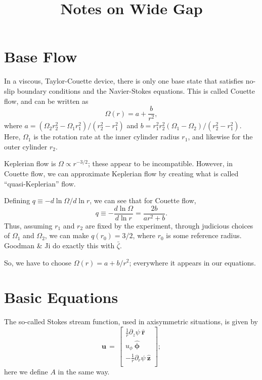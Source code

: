 \documentclass{paper}
\newcommand{\uphi}{\ensuremath{u_\phi}}
\newcommand{\rhat}{\ensuremath{\mathbf{\hat{r}}}}
\newcommand{\phihat}{\ensuremath{\mathbf{\hat{\phi}}}}
\newcommand{\zhat}{\ensuremath{\mathbf{\hat{z}}}}
\begin{document}
\title{Notes on Wide Gap}

\section{Base Flow}
In a viscous, Taylor-Couette device, there is only one base state that
satisfies no-slip boundary conditions and the Navier-Stokes
equations. This is called Couette flow, and can be written as
\begin{equation}
  \label{eq:couette_flow}
  \Omega(r) = a + \frac{b}{r^2},
\end{equation}
where $a = (\Omega_2 r^2_2 - \Omega_1 r^2_1)/(r^2_2 - r^2_1)$ and
$b = r^2_1 r^2_2 (\Omega_1 - \Omega_2)/(r^2_2 - r^2_1)$. Here,
$\Omega_1$ is the rotation rate at the inner cylinder radius $r_1$,
and likewise for the outer cylinder $r_2$. 

Keplerian flow is $\Omega \propto r^{-3/2}$; these appear to be
incompatible. However, in Couette flow, we can approximate Keplerian
flow by creating what is called ``quasi-Keplerian'' flow. 

Defining $q \equiv -d \ln \Omega/d \ln r$, we can see that for Couette flow,
\begin{equation}
  \label{eq:couette_q}
  q \equiv -\frac{d \ln \Omega}{d \ln r} = \frac{2 b}{a r^2 + b}.
\end{equation}
Thus, assuming $r_1$ and $r_2$ are fixed by the experiment, through
judicious choices of $\Omega_1$ and $\Omega_2$, we can make
$q(r_0) = 3/2$, where $r_0$ is some reference radius. Goodman \& Ji do
exactly this with $\bar{\zeta}$.

So, we have to choose $\Omega(r) = a + b/r^2$; everywhere it appears in our equations.

\section{Basic Equations}
\label{sec:equations}
The so-called Stokes stream function, used in axisymmetric situations, is given by 
\begin{equation}
  \label{eq:stokes}
  \mathbf{u} \, = \, \left[\begin{matrix}
\frac{1}{r} \partial_z \psi\ \rhat\\
\uphi \ \phihat\\
-\frac{1}{r} \partial_r \psi\ \zhat\\
\end{matrix}\right];
\end{equation}
here we define $A$ in the same way. \\
\end{document}
